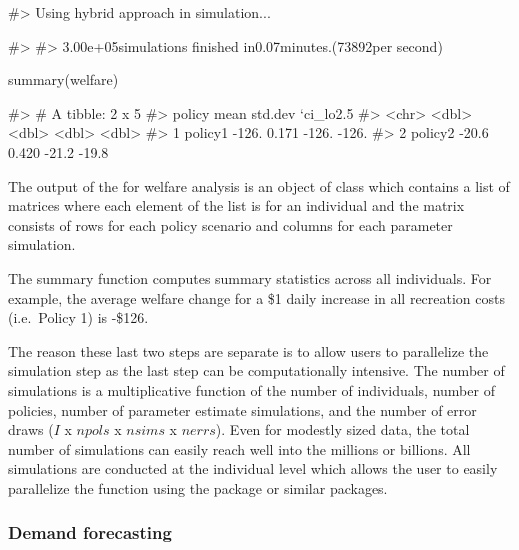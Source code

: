 \begin{Schunk}
\begin{Soutput}
#> Using hybrid approach in simulation...
\end{Soutput}
\begin{Soutput}
#> 
#> 3.00e+05simulations finished in0.07minutes.(73892per second)
\end{Soutput}
\begin{Sinput}
summary(welfare)
\end{Sinput}
\begin{Soutput}
#> # A tibble: 2 x 5
#>   policy    mean std.dev `ci_lo2.5%` `ci_hi97.5%`
#>   <chr>    <dbl>   <dbl>       <dbl>        <dbl>
#> 1 policy1 -126.    0.171      -126.        -126. 
#> 2 policy2  -20.6   0.420       -21.2        -19.8
\end{Soutput}
\end{Schunk}

The output of the  for welfare analysis is an object of
class  which contains a list of matrices where each
element of the list is for an individual and the matrix consists of rows
for each policy scenario and columns for each parameter simulation.

The summary function computes summary statistics across all individuals.
For example, the average welfare change for a \$1 daily increase in all
recreation costs (i.e.~Policy 1) is -\$126.

The reason these last two steps are separate is to allow users to
parallelize the simulation step as the last step can be computationally
intensive. The number of simulations is a multiplicative function of the
number of individuals, number of policies, number of parameter estimate
simulations, and the number of error draws (\(I\) x \(npols\) x
\(nsims\) x \(nerrs\)). Even for modestly sized data, the total number
of simulations can easily reach well into the millions or billions. All
simulations are conducted at the individual level which allows the user
to easily parallelize the  function using the
 package or similar packages.

\hypertarget{demand-forecasting}{%
\subsubsection{Demand forecasting}\label{demand-forecasting}}

